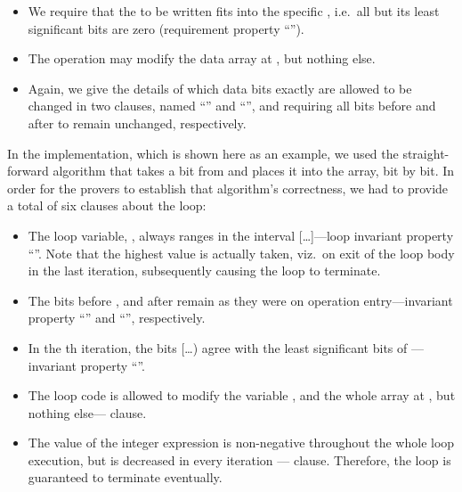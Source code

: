 \clearpage

\begin{itemize}
\item We require that the  to be written fits into
the specific
	, i.e.\ all but its 
	least significant bits are
	zero (requirement property ``'').
\item The operation may modify the data array at ,
but nothing else.
\item Again, we give the details of which data bits exactly
	are allowed to be changed in two
	 clauses, named ``'' and
	``'', and requiring all bits before
	 and after
	 to remain unchanged, respectively.
\end{itemize}

In the implementation, which is shown here as an example, we used
the straight-forward
algorithm that takes a bit from  and places it into
the  array, bit by bit.
%
In order for the provers to establish that algorithm's correctness,
we had to provide a total of six \acsl clauses about the loop:
%
\begin{itemize}
\item The loop variable, , always ranges in the interval
	[\ldots{}]---loop invariant property ``''.
	Note that the highest value is actually taken,
	viz.\ on exit of the loop body in the last iteration,
	subsequently causing the loop to terminate.
\item The bits before , and after
	remain as they were on operation entry---invariant property
	``'' and ``'', respectively.
\item In the th iteration, the bits
	[\ldots{}) agree with
	the least significant
	 bits of ---invariant property
	``''.
\item The loop code is allowed to modify the variable ,
	and the whole array
	at , but nothing else---
	 clause.
\item The value of the integer
	expression  is non-negative throughout
	the whole loop execution, but is decreased in every iteration 
	---  clause.
	Therefore, the loop is guaranteed to terminate eventually.
\end{itemize}




